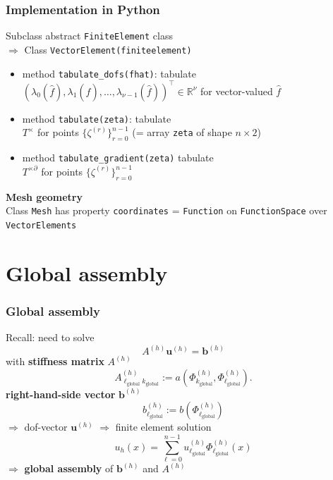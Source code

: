 \documentclass{beamer}
\renewcommand{\vec}[1]{\boldsymbol{#1}}
\begin{document}

\begin{frame}[fragile]
  \frametitle{Implementation in Python}
Subclass abstract \lstinline{FiniteElement} class\\[1ex]
$\Rightarrow$ Class \lstinline{VectorElement(finiteelement)}
\begin{itemize}
\item method \lstinline{tabulate_dofs(fhat)}: tabulate $\left(\lambda_0(\widehat{f}),\lambda_1(\widehat{f}),\dots,\lambda_{\nu-1}(\widehat{f})\right)^\top\in \mathbb{R}^{\nu}$
for vector-valued $\widehat{f}$
\item method \lstinline{tabulate(zeta)}: tabulate\\$T^\times$ for points $\{\zeta^{(r)}\}_{r=0}^{n-1}$  (= array \lstinline{zeta} of shape $n\times 2$)
\item method \lstinline{tabulate_gradient(zeta)} tabulate\\$T^{\times\partial}$ for points $\{\zeta^{(r)}\}_{r=0}^{n-1}$
\end{itemize}
\textbf{Mesh geometry}\\[1ex]
Class \lstinline{Mesh} has property \lstinline{coordinates} = \lstinline{Function} on \lstinline{FunctionSpace} over \lstinline{VectorElements}
\end{frame}


\section{Global assembly}


\begin{frame}
  \tableofcontents[currentsection]
\end{frame}



\begin{frame}
  \frametitle{Global assembly}
  Recall: need to solve
  $$
A^{(h)} \boldsymbol{u}^{(h)} = \boldsymbol{b}^{(h)}
$$
with \textbf{stiffness matrix} $A^{(h)}$
$$
A^{(h)}_{{\ell_{\text{global}}}{k_{\text{global}}}}:= a\left(\Phi^{(h)}_{k_{\text{global}}},\Phi^{(h)}_{\ell_{\text{global}}}\right).
$$
\textbf{right-hand-side vector} $\vec{b}^{(h)}$
$$
b^{(h)}_{\ell_{\text{global}}}:=b(\Phi^{(h)}_{\ell_{\text{global}}})
$$
$\Rightarrow$ dof-vector $\boldsymbol{u}^{(h)}$ $\Rightarrow$ finite element solution
$$
u_h(x) = \sum_{\ell=0}^{n-1} u^{(h)}_{\ell_{\text{global}}} \Phi^{(h)}_{\ell_{\text{global}}}(x)
$$
$\Rightarrow$ \textbf{global assembly} of $\vec{b}^{(h)}$ and $A^{(h)}$
\end{frame}
\end{document}

